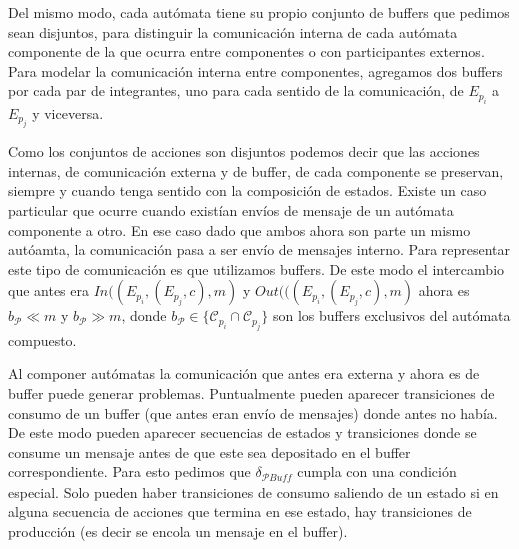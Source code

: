 \begin{definition}[Composición]
Del mismo modo, cada autómata tiene su propio conjunto de buffers que pedimos sean disjuntos, para distinguir la comunicación interna de cada autómata componente de la que ocurra entre componentes o con participantes externos. Para modelar la comunicación interna entre componentes, agregamos dos buffers por cada par de integrantes, uno para cada sentido de la comunicación, de $E_{p_i}$ a $E_{p_j}$ y viceversa.

Como los conjuntos de acciones son disjuntos podemos decir que las acciones internas, de comunicación externa y de buffer, de cada componente se preservan, siempre y cuando tenga sentido con la composición de estados. Existe un caso particular que ocurre cuando existían envíos de mensaje de un autómata componente a otro. En ese caso dado que ambos ahora son parte un mismo autóamta, la comunicación pasa a ser envío de mensajes interno. Para representar este tipo de comunicación es que utilizamos buffers. De este modo el intercambio que antes era $In((E_{p_i},(E_{p_j},c),m)$ y $Out(((E_{p_i},(E_{p_j},c),m)$ ahora es $b_{\mathcal{P}}  \ll m$ y $b_{\mathcal{P}}  \gg  m$, donde $ b_{\mathcal{P}} \in \{ \mathcal{C}_{p_i} \cap \mathcal{C}_{p_j} \} $ son los buffers exclusivos del autómata compuesto. 

Al componer autómatas la comunicación que antes era externa y ahora es de buffer puede generar problemas. Puntualmente pueden aparecer transiciones de consumo de un buffer (que antes eran envío de mensajes) donde antes no había. De este modo pueden aparecer secuencias de estados y transiciones donde se consume un mensaje antes de que este sea depositado en el buffer correspondiente. Para esto pedimos que $\delta_\mathit{\mathcal{P}Buff}$ cumpla con una condición especial. Solo pueden haber transiciones de consumo saliendo de un estado si en alguna secuencia de acciones que termina en ese estado, hay transiciones de producción (es decir se encola un mensaje en el buffer).

\end{definition}



